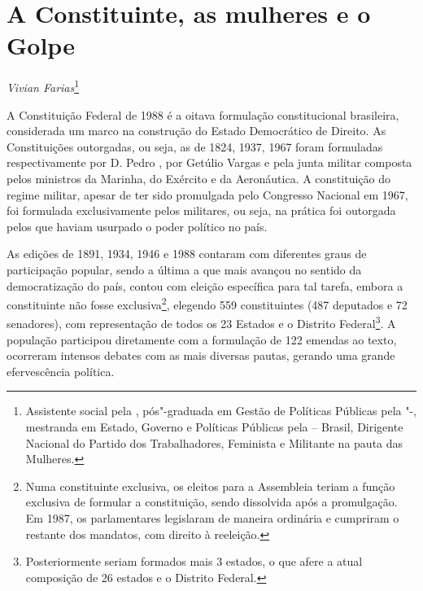 \chapter*{A Constituinte, as mulheres e o Golpe}


\begin{flushright}
\emph{Vivian Farias}\footnote{Assistente social pela , pós"-graduada em
  Gestão de Políticas Públicas pela "-, mestranda em Estado,
  Governo e Políticas Públicas pela  -- Brasil, Dirigente Nacional
  do Partido dos Trabalhadores, Feminista e Militante na pauta das
  Mulheres.}
\end{flushright}

A Constituição Federal de 1988 é a oitava formulação constitucional
brasileira, considerada um marco na construção do Estado Democrático de
Direito. As Constituições outorgadas, ou seja, as de 1824, 1937, 1967
foram formuladas respectivamente por D. Pedro , por Getúlio Vargas e
pela junta militar composta pelos ministros da Marinha, do Exército e da
Aeronáutica. A constituição do regime militar, apesar de ter sido
promulgada pelo Congresso Nacional em 1967, foi formulada exclusivamente
pelos militares, ou seja, na prática foi outorgada pelos que haviam
usurpado o poder político no país.

As edições de 1891, 1934, 1946 e 1988 contaram com diferentes graus de
participação popular, sendo a última a que mais avançou no sentido da
democratização do país, contou com eleição específica para tal tarefa,
embora a constituinte não fosse exclusiva\footnote{Numa constituinte
  exclusiva, os eleitos para a Assembleia teriam a função exclusiva de
  formular a constituição, sendo dissolvida após a promulgação. Em 1987,
  os parlamentares legislaram de maneira ordinária e cumpriram o
  restante dos mandatos, com direito à reeleição.}, elegendo 559
constituintes (487 deputados e 72 senadores), com representação de todos
os 23 Estados e o Distrito Federal\footnote{Posteriormente seriam
  formados mais 3 estados, o que afere a atual composição de 26 estados
  e o Distrito Federal.}. A população participou diretamente com a
formulação de 122 emendas ao texto, ocorreram intensos debates com as
mais diversas pautas, gerando uma grande efervescência política.

